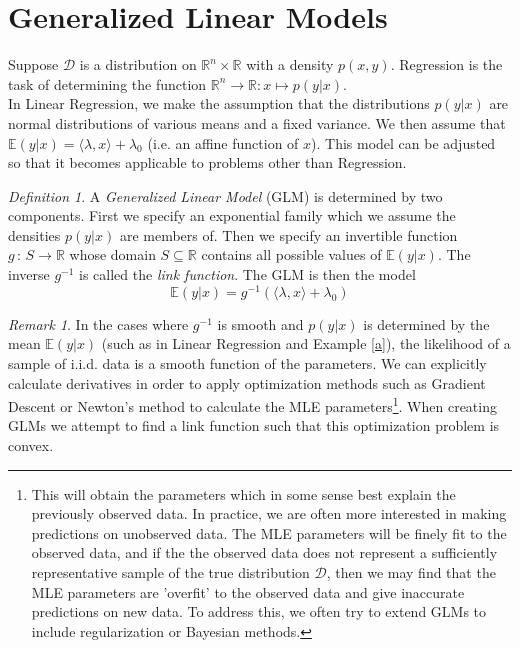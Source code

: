 \documentclass[BSc]{usydthesis}
\numberwithin{equation}{chapter}
\theoremstyle{remark}
\newtheorem{Definition}[equation]{Definition}
\newtheorem{Remark}[equation]{Remark}
\newcommand{\la}{\lambda}
\newcommand{\map}[2]{\,{:}\,#1\!\longrightarrow\!#2}
\begin{document}
\section{Generalized Linear Models}

Suppose $\mathcal{D}$ is a distribution on $\mathbb{R}^n  \times \mathbb{R}$ with a density $p(x, y).$ Regression is the task of determining the function $\mathbb{R}^n \to \mathbb{R} : x \mapsto p(y|x).$ \\

In Linear Regression, we make the assumption that the distributions $p(y|x)$ are normal distributions of various means and a fixed variance. We then assume that $\mathbb{E}(y|x) = \langle \la, x\rangle + \la_0$ (i.e. an affine function of $x$). This model can be adjusted so that it becomes applicable to problems other than Regression. \\

\begin{Definition}
 A {\em Generalized Linear Model} (GLM) is determined by two components. First we specify an exponential family which we assume the densities $p(y|x)$ are members of. Then we specify an invertible function $g \map{S}{\mathbb{R}}$ whose domain $S\subseteq \mathbb{R}$ contains all possible values of $\mathbb{E}(y|x).$ The inverse $g^{-1}$ is called the {\em link function}. The GLM is then the model $$\mathbb{E}(y|x) = g^{-1}(\langle \la, x \rangle + \la_0)$$ 
\end{Definition}

\begin{Remark}
 In the cases where $g^{-1}$ is smooth and $p(y|x)$ is determined by the mean $\mathbb{E}(y|x)$ (such as in Linear Regression and Example \ref{a}), the likelihood of a sample of i.i.d. data is a smooth function of the parameters. We can explicitly calculate derivatives in order to apply optimization methods such as Gradient Descent or Newton's method to calculate the MLE parameters\footnote{This will obtain the parameters which in some sense best explain the previously observed data. In practice, we are often more interested in making predictions on unobserved data. The MLE parameters will be finely fit to the observed data, and if the the observed data does not represent a sufficiently representative sample of the true distribution $\mathcal{D}$, then we may find that the MLE parameters are 'overfit' to the observed data and give inaccurate predictions on new data. To address this, we often try to extend GLMs to include regularization or Bayesian methods.}. When creating GLMs we attempt to find a link function such that this optimization problem is convex.
\end{Remark}
 
\end{document}
